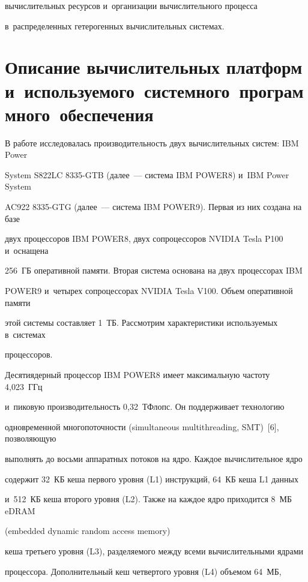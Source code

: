 вычислительных ресурсов и~организации вычислительного процесса 


в~распределенных гетерогенных вычислительных системах.





\section{Описание вычислительных платформ и~используемого~системного~программного~обеспечения} %





В работе исследовалась производительность двух вычислительных систем: IBM Power 


System S822LC 8335-GTB (далее~--- система IBM POWER8) и~IBM Power System 


AC922 8335-GTG (далее~--- система IBM POWER9). Первая из них создана на базе 


двух процессоров IBM POWER8, двух сопроцессоров NVIDIA Tesla P100 и~оснащена 


256~ГБ оперативной памяти. Вторая система основана на двух процессорах IBM 


POWER9 и~четырех сопроцессорах NVIDIA Tesla V100. Объем оперативной памяти 


этой системы составляет 1~ТБ. Рассмотрим характеристики используемых в~системах 


процессоров.





Десятиядерный процессор IBM POWER8 имеет максимальную частоту 4,023~ГГц 


и~пиковую производительность 0,32~ТФлопс. Он поддерживает технологию 


одновременной многопоточности (simultaneous multithreading, SMT)~[6], позволяющую 


выполнять до восьми аппаратных потоков на ядро. Каждое вы\-чис\-ли\-тель\-ное ядро 


содержит 32~КБ кеша первого уровня (L1) инструкций, 64~КБ кеша L1 данных 


и~512~КБ кеша второго уровня (L2). Также на каждое ядро приходится 8~МБ eDRAM 


(embedded dynamic random access memory)


кеша третьего уровня (L3), разделяемого между всеми вычислительными ядрами 


процессора. Дополнительный кеш четвертого уровня (L4) объемом 64~МБ, 


